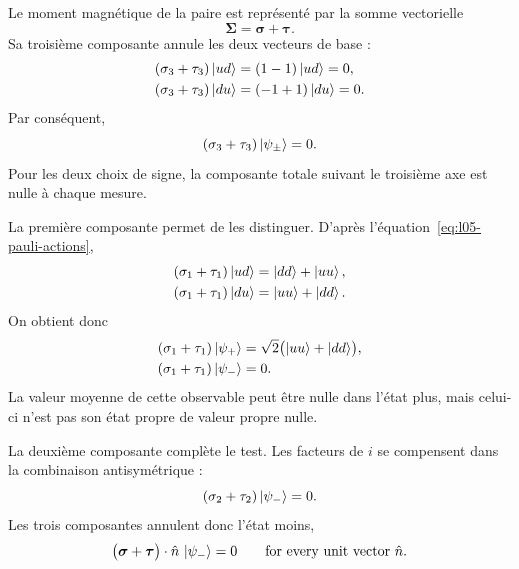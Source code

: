 Le moment magnétique de la paire est représenté par la somme vectorielle
\begin{equation}
  \boldsymbol{\Sigma}
  =
  \boldsymbol{\sigma}+\boldsymbol{\tau}.
\end{equation}
Sa troisième composante annule les deux vecteurs de base :
\begin{align}
  (\sigma_3+\tau_3)\left\lvert ud\right\rangle
  &=(1-1)\left\lvert ud\right\rangle=0,\nonumber\\
  (\sigma_3+\tau_3)\left\lvert du\right\rangle
  &=(-1+1)\left\lvert du\right\rangle=0.
\end{align}
Par conséquent,
\begin{equation}
  (\sigma_3+\tau_3)\left\lvert\psi_\pm\right\rangle=0.
\end{equation}
Pour les deux choix de signe, la composante totale suivant le troisième axe est nulle à chaque mesure.

La première composante permet de les distinguer. D’après l’équation~\eqref{eq:l05-pauli-actions},
\begin{align}
  (\sigma_1+\tau_1)\left\lvert ud\right\rangle
  &=\left\lvert dd\right\rangle+\left\lvert uu\right\rangle,\nonumber\\
  (\sigma_1+\tau_1)\left\lvert du\right\rangle
  &=\left\lvert uu\right\rangle+\left\lvert dd\right\rangle.
\end{align}
On obtient donc
\begin{align}
  (\sigma_1+\tau_1)\left\lvert\psi_+\right\rangle
  &=
  \sqrt2\bigl(\left\lvert uu\right\rangle+\left\lvert dd\right\rangle\bigr),\nonumber\\
  (\sigma_1+\tau_1)\left\lvert\psi_-\right\rangle
  &=0.
  \label{eq:l05-total-x}
\end{align}
La valeur moyenne de cette observable peut être nulle dans l’état plus, mais celui-ci n’est pas son état propre de valeur propre nulle.

\begin{classroomqa}
\end{classroomqa}

La deuxième composante complète le test. Les facteurs de \(i\) se compensent dans la combinaison antisymétrique :
\begin{equation}
  (\sigma_2+\tau_2)\left\lvert\psi_-\right\rangle=0.
\end{equation}
Les trois composantes annulent donc l’état moins,
\begin{equation}
  \bigl(\boldsymbol{\sigma}+\boldsymbol{\tau}\bigr)
  \cdot\hat n\,\left\lvert\psi_-\right\rangle=0
  \qquad\text{for every unit vector }\hat n.
  \label{eq:l05-singlet-any-axis}
\end{equation}

